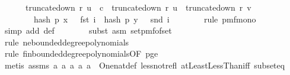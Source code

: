 \begin{isabellebody}
\ \ \ \ \ \ truncate{\isacharunderscore}{\kern0pt}down\ r\ u\ {\isasymle}\ c\ {\isasymand}\ truncate{\isacharunderscore}{\kern0pt}down\ r\ u\ {\isacharequal}{\kern0pt}\ truncate{\isacharunderscore}{\kern0pt}down\ r\ v{\isacharbraceright}{\kern0pt}{\isachardot}{\kern0pt}\isanewline
\ \ \ \ \ \ {\isacharbraceleft}{\kern0pt}{\isasymomega}{\isachardot}{\kern0pt}\ \ hash\ p\ x\ {\isasymomega}\ {\isacharequal}{\kern0pt}\ fst\ i\ {\isasymand}\ hash\ p\ y\ {\isasymomega}\ {\isacharequal}{\kern0pt}\ snd\ i{\isacharbraceright}{\kern0pt}{\isacharparenright}{\kern0pt}{\isachardoublequoteclose}\isanewline
\ \ \ \ \ \ \isamarkupfalse%
\ {\isacharparenleft}{\kern0pt}rule\ pmf{\isacharunderscore}{\kern0pt}mono{\isacharunderscore}{\kern0pt}{}{\isacharparenright}{\kern0pt}\isanewline
\ \ \ \ \ \ \isamarkupfalse%
\ {\isacharparenleft}{\kern0pt}simp\ add{\isacharcolon}{\kern0pt}\ {\isasymOmega}{\isacharunderscore}{\kern0pt}def{\isacharparenright}{\kern0pt}\isanewline
\ \ \ \ \ \ \isamarkupfalse%
\ {\isacharparenleft}{\kern0pt}subst\ {\isacharparenleft}{\kern0pt}asm{\isacharparenright}{\kern0pt}\ set{\isacharunderscore}{\kern0pt}pmf{\isacharunderscore}{\kern0pt}of{\isacharunderscore}{\kern0pt}set{\isacharparenright}{\kern0pt}\isanewline
\ \ \ \ \ \ \ \ \isamarkupfalse%
\ {\isacharparenleft}{\kern0pt}rule\ ne{\isacharunderscore}{\kern0pt}bounded{\isacharunderscore}{\kern0pt}degree{\isacharunderscore}{\kern0pt}polynomials{\isacharparenright}{\kern0pt}\isanewline
\ \ \ \ \ \ \isamarkupfalse%
\ {\isacharparenleft}{\kern0pt}rule\ fin{\isacharunderscore}{\kern0pt}bounded{\isacharunderscore}{\kern0pt}degree{\isacharunderscore}{\kern0pt}polynomials{\isacharbrackleft}{\kern0pt}OF\ p{\isacharunderscore}{\kern0pt}ge{\isacharunderscore}{\kern0pt}{}{\isacharbrackright}{\kern0pt}{\isacharparenright}{\kern0pt}\isanewline
\ \ \ \ \ \ \isamarkupfalse%
\ {\isacharparenleft}{\kern0pt}metis\ assms{\isacharparenleft}{\kern0pt}{}{\isacharparenright}{\kern0pt}\ a{}\ a{}\ a{}{\isacharunderscore}{\kern0pt}{}\ a{}{\isacharunderscore}{\kern0pt}{}\ a{}{\isacharunderscore}{\kern0pt}{}\ \ One{\isacharunderscore}{\kern0pt}nat{\isacharunderscore}{\kern0pt}def\ less{\isacharunderscore}{\kern0pt}not{\isacharunderscore}{\kern0pt}refl{}\ atLeastLessThan{\isacharunderscore}{\kern0pt}iff\ subset{\isacharunderscore}{\kern0pt}eq{\isacharparenright}{\kern0pt}\isanewline

\end{isabellebody}
